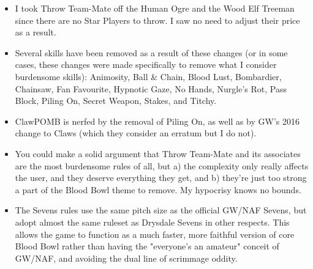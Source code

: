 \begin{multicols}{2}
\begin{itemize}
\item I took Throw Team-Mate off the Human Ogre and the Wood Elf Treeman since there are no Star Players to throw. I saw no need to adjust their price as a result.
\item Several skills have been removed as a result of these changes (or in some cases, these changes were made specifically to remove what I consider burdensome skills): Animosity, Ball \& Chain, Blood Lust, Bombardier, Chainsaw, Fan Favourite, Hypnotic Gaze, No Hands, Nurgle's Rot, Pass Block, Piling On, Secret Weapon, Stakes, and Titchy.
\item ClawPOMB is nerfed by the removal of Piling On, as well as by GW's 2016 change to Claws (which they consider an erratum but I do not).
\item You could make a solid argument that Throw Team-Mate and its associates are the most burdensome rules of all, but a) the complexity only really affects the user, and they deserve everything they get, and b) they're just too strong a part of the Blood Bowl theme to remove. My hypocrisy knows no bounds.
\item The Sevens rules use the same pitch size as the official GW/NAF Sevens, but adopt almost the same ruleset as Drysdale Sevens in other respects. This allows the game to function as a much faster, more faithful version of core Blood Bowl rather than having the "everyone's an amateur" conceit of GW/NAF, and avoiding the dual line of scrimmage oddity.
\end{itemize}

\end{multicols}
